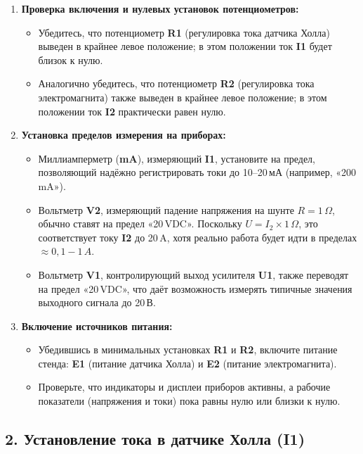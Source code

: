 \documentclass[12pt,a4paper]{article}
\begin{document}
\begin{enumerate}
    \item \textbf{Проверка включения и нулевых установок потенциометров:}
    \begin{itemize}
        \item Убедитесь, что потенциометр \textbf{R1} (регулировка тока датчика Холла) выведен в крайнее левое положение; в этом положении ток \textbf{I1} будет близок к нулю.
        \item Аналогично убедитесь, что потенциометр \textbf{R2} (регулировка тока электромагнита) также выведен в крайнее левое положение; в этом положении ток \textbf{I2} практически равен нулю.
    \end{itemize}
    \item \textbf{Установка пределов измерения на приборах:}
    \begin{itemize}
        \item Миллиамперметр (\textbf{mA}), измеряющий \textbf{I1}, установите на предел, позволяющий надёжно регистрировать токи до 10--20\,мА (например, «200\,mA»).
        \item Вольтметр \textbf{V2}, измеряющий падение напряжения на шунте $R=1\,\Omega$, обычно ставят на предел «20\,VDC». Поскольку $U=I_2 \times 1\,\Omega$, это соответствует току \textbf{I2} до 20\,A, хотя реально работа будет идти в пределах $\approx0{,}1\!-\!1\,A$.
        \item Вольтметр \textbf{V1}, контролирующий выход усилителя \textbf{U1}, также переводят на предел «20\,VDC», что даёт возможность измерять типичные значения выходного сигнала до 20\,В.
    \end{itemize}
    \item \textbf{Включение источников питания:}
    \begin{itemize}
        \item Убедившись в минимальных установках \textbf{R1} и \textbf{R2}, включите питание стенда: \textbf{E1} (питание датчика Холла) и \textbf{E2} (питание электромагнита).
        \item Проверьте, что индикаторы и дисплеи приборов активны, а рабочие показатели (напряжения и токи) пока равны нулю или близки к нулю.
    \end{itemize}
\end{enumerate}

\subsection*{2. Установление тока в датчике Холла (I1)}
\end{document}
